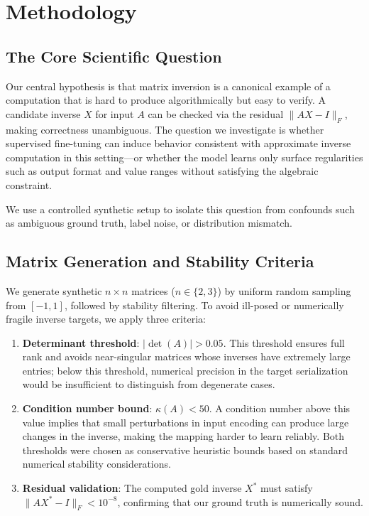 \section{Methodology}
\label{sec:methodology}

\subsection{The Core Scientific Question}

Our central hypothesis is that matrix inversion is a canonical example of a computation that is hard to produce algorithmically but easy to verify. A candidate inverse $X$ for input $A$ can be checked via the residual $\|AX - I\|_F$, making correctness unambiguous. The question we investigate is whether supervised fine-tuning can induce behavior consistent with approximate inverse computation in this setting---or whether the model learns only surface regularities such as output format and value ranges without satisfying the algebraic constraint.

We use a controlled synthetic setup to isolate this question from confounds such as ambiguous ground truth, label noise, or distribution mismatch.

\subsection{Matrix Generation and Stability Criteria}

We generate synthetic $n \times n$ matrices ($n \in \{2, 3\}$) by uniform random sampling from $[-1, 1]$, followed by stability filtering. To avoid ill-posed or numerically fragile inverse targets, we apply three criteria:

\begin{enumerate}
    \item \textbf{Determinant threshold}: $|\det(A)| > 0.05$. This threshold ensures full rank and avoids near-singular matrices whose inverses have extremely large entries; below this threshold, numerical precision in the target serialization would be insufficient to distinguish from degenerate cases.
    \item \textbf{Condition number bound}: $\kappa(A) < 50$. A condition number above this value implies that small perturbations in input encoding can produce large changes in the inverse, making the mapping harder to learn reliably. Both thresholds were chosen as conservative heuristic bounds based on standard numerical stability considerations.
    \item \textbf{Residual validation}: The computed gold inverse $X^*$ must satisfy $\|AX^* - I\|_F < 10^{-8}$, confirming that our ground truth is numerically sound.
\end{enumerate}

